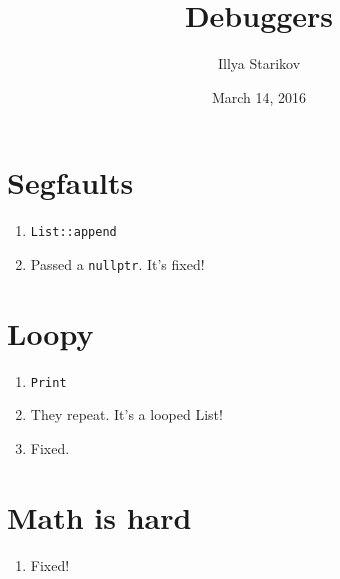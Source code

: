\documentclass{article}
\author{Illya Starikov}
\date{ March 14, 2016 }
\title{Debuggers}
\begin{document}
\maketitle

\section{Segfaults}
\begin{enumerate}
    \item \texttt{List::append}
    \item Passed a \texttt{nullptr}. It's fixed!
\end{enumerate}

\section{Loopy}
\begin{enumerate}
    \item \texttt{Print}
    \item They repeat. It's a looped List!
    \item Fixed.
\end{enumerate}

\section{Math is hard}
\begin{enumerate}
    \item Fixed!
\end{enumerate}
\end{document}
